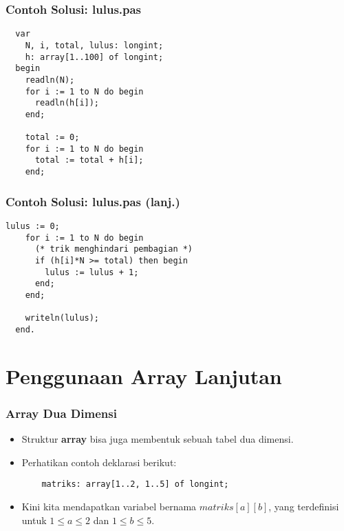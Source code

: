 \begin{frame}[fragile]
\frametitle{Contoh Solusi: lulus.pas}
\begin{lstlisting}
  var
    N, i, total, lulus: longint;
    h: array[1..100] of longint;
  begin
    readln(N);
    for i := 1 to N do begin
      readln(h[i]);
    end;

    total := 0;
    for i := 1 to N do begin
      total := total + h[i];
    end;
\end{lstlisting}
\end{frame}

\begin{frame}[fragile]
\frametitle{Contoh Solusi: lulus.pas (lanj.)}
\begin{lstlisting}[gobble=2]
    lulus := 0;
    for i := 1 to N do begin
      (* trik menghindari pembagian *)
      if (h[i]*N >= total) then begin
        lulus := lulus + 1;
      end;
    end;

    writeln(lulus);
  end.
\end{lstlisting}
\end{frame}

\section{Penggunaan Array Lanjutan}
\frame{\sectionpage}

\begin{frame}[fragile]
\frametitle{Array Dua Dimensi}
\begin{itemize}
  \item Struktur \textbf{array} bisa juga membentuk sebuah tabel dua dimensi.
  \item Perhatikan contoh deklarasi berikut:
  \begin{lstlisting}
    matriks: array[1..2, 1..5] of longint;
  \end{lstlisting}
  \item Kini kita mendapatkan variabel bernama $matriks[a][b]$, yang terdefinisi untuk $1 \le a \le 2$ dan $1 \le b \le 5$.
\end{itemize}
\end{frame}

